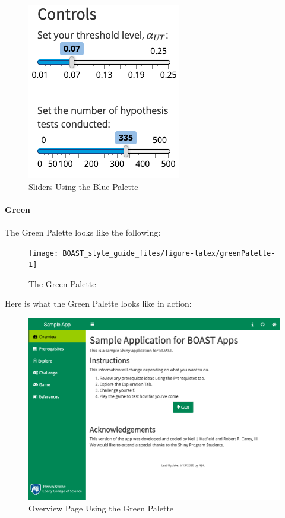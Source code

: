 \documentclass[]{book}
\let\oldparagraph\paragraph
\renewcommand{\paragraph}[1]{\oldparagraph{#1}\mbox{}}
\begin{document}
\begin{figure}

{\centering \includegraphics{images/blueSliders} 

}

\caption{Sliders Using the Blue Palette}\label{fig:blueAction3}
\end{figure}

\hypertarget{green}{%
\paragraph{Green}\label{green}}

The Green Palette looks like the following:

\begin{figure}

{\centering \texttt{[image: BOAST\_style\_guide\_files/figure-latex/greenPalette-1]} 

}

\caption{The Green Palette}\label{fig:greenPalette}
\end{figure}

Here is what the Green Palette looks like in action:

\begin{figure}

{\centering \includegraphics[width=14in]{images/greenOverview} 

}

\caption{Overview Page Using the Green Palette}\label{fig:greenAction1}
\end{figure}
\end{document}
